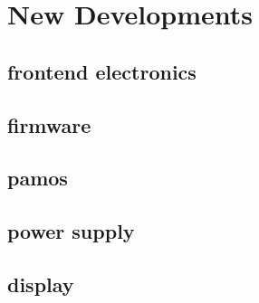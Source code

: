 
\chapter{New Developments}
\label{sec:new_develop}



\section{frontend electronics}
\section{firmware}
\section{pamos}
\section{power supply}
\section{display}